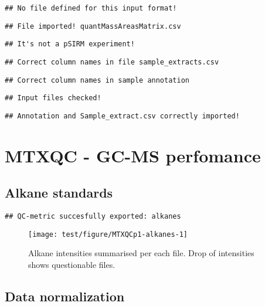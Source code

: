 \documentclass[9pt,]{article}
\begin{document}
\begin{verbatim}
## No file defined for this input format!
\end{verbatim}

\begin{verbatim}
## File imported! quantMassAreasMatrix.csv
\end{verbatim}

\begin{verbatim}
## It's not a pSIRM experiment!
\end{verbatim}

\begin{verbatim}
## Correct column names in file sample_extracts.csv
\end{verbatim}

\begin{verbatim}
## Correct column names in sample annotation
\end{verbatim}

\begin{verbatim}
## Input files checked!
\end{verbatim}

\begin{verbatim}
## Annotation and Sample_extract.csv correctly imported!
\end{verbatim}

\section{MTXQC - GC-MS perfomance}\label{mtxqc---gc-ms-perfomance}

\subsection{Alkane standards}\label{alkane-standards}

\begin{verbatim}
## QC-metric succesfully exported: alkanes
\end{verbatim}

\begin{figure}

{\centering \texttt{[image: test/figure/MTXQCp1-alkanes-1]} 

}

\caption{Alkane intensities summarised per each file. Drop of intensities shows questionable files.}\label{fig:alkanes}
\end{figure}

\subsection{Data normalization}\label{data-normalization}
\end{document}
